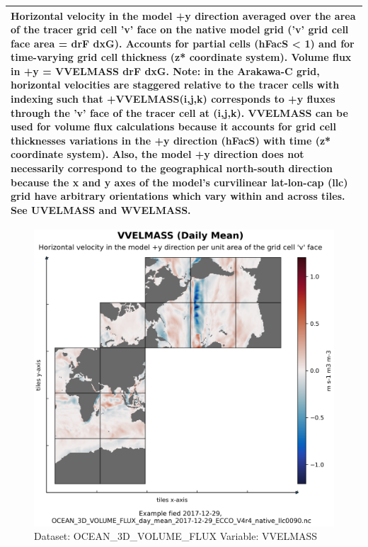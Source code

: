 \begin{longtable}{|m{}|m{}|m{}|m{}|}
\multicolumn{4}{|p{1\textwidth}|}{Horizontal velocity in the model +y direction averaged over the area of the tracer grid cell 'v' face on the native model grid ('v' grid cell face area = drF dxG). Accounts for partial cells (hFacS < 1) and for time-varying grid cell thickness (z* coordinate system). Volume flux in +y = VVELMASS drF dxG. Note: in the Arakawa-C grid, horizontal velocities are staggered relative to the tracer cells with indexing such that +VVELMASS(i,j,k) corresponds to +y fluxes through the 'v' face of the tracer cell at (i,j,k). VVELMASS can be used for volume flux calculations because it accounts for grid cell thicknesses variations in the +y direction (hFacS) with time (z* coordinate system). Also, the model +y direction does not necessarily correspond to the geographical north-south direction because the x and y axes of the model's curvilinear lat-lon-cap (llc) grid have arbitrary orientations which vary within and across tiles. See UVELMASS and WVELMASS.} \\ \hline
\end{longtable}

\begin{figure}[H]
\centering
\includegraphics[scale=0.55]{../images/plots/native_plots/Ocean_Three-Dimensional_Volume_Fluxes/VVELMASS.png}
\caption{Dataset: OCEAN\_3D\_VOLUME\_FLUX Variable: VVELMASS}
\label{tab:table-OCEAN_3D_VOLUME_FLUX_VVELMASS-Plot}
\end{figure}
\pagebreak
